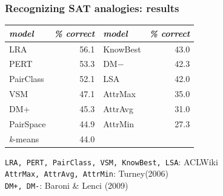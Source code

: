 \begin{frame}
  \frametitle{Recognizing SAT analogies: results}

\begin{center}
 \begin{table}[tbh]
  \begin{small}
    \begin{center}
      \begin{tabular}{|l|r||l|r|}
        \hline
        \emph{model} & \emph{\% correct} & \emph{model} & \emph{\% correct} \\
        \hline
        \hline
        LRA & 56.1&KnowBest & 43.0\\
        \hline
        PERT & 53.3& DM$-$ & 42.3\\
        \hline
        PairClass & 52.1&LSA& 42.0\\
        \hline
        VSM & 47.1&AttrMax & 35.0\\
        \hline
        DM+ & 45.3&AttrAvg & 31.0\\
        \hline
        PairSpace & 44.9&AttrMin & 27.3\\
        \hline
        \emph{k}-means & 44.0&\color{primary}{Random} & \color{primary}{20.0}\\
        \hline
      \end{tabular}
         \end{center}
  \end{small}
\end{table}
  \end{center}


 \begin{center}
  \footnotesize
  {\tt LRA, PERT, PairClass, VSM, KnowBest, LSA}: ACLWiki\\
  {\tt AttrMax, AttrAvg, AttrMin}: Turney(2006)\\
  {\tt DM+, DM-}: Baroni \& Lenci (2009)
\end{center}

\end{frame}

